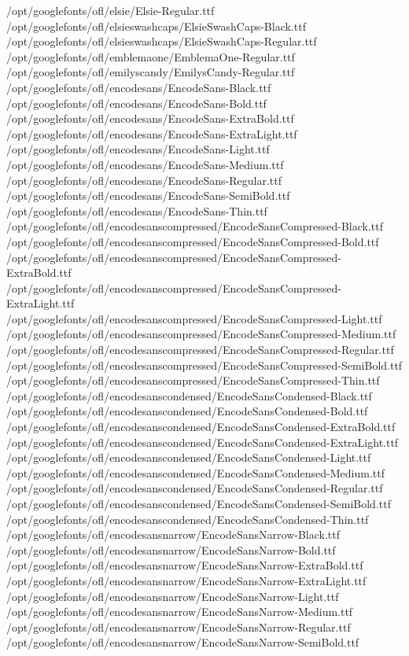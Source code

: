 /opt/googlefonts/ofl/elsie/Elsie-Regular.ttf
/opt/googlefonts/ofl/elsieswashcaps/ElsieSwashCaps-Black.ttf
/opt/googlefonts/ofl/elsieswashcaps/ElsieSwashCaps-Regular.ttf
/opt/googlefonts/ofl/emblemaone/EmblemaOne-Regular.ttf
/opt/googlefonts/ofl/emilyscandy/EmilysCandy-Regular.ttf
/opt/googlefonts/ofl/encodesans/EncodeSans-Black.ttf
/opt/googlefonts/ofl/encodesans/EncodeSans-Bold.ttf
/opt/googlefonts/ofl/encodesans/EncodeSans-ExtraBold.ttf
/opt/googlefonts/ofl/encodesans/EncodeSans-ExtraLight.ttf
/opt/googlefonts/ofl/encodesans/EncodeSans-Light.ttf
/opt/googlefonts/ofl/encodesans/EncodeSans-Medium.ttf
/opt/googlefonts/ofl/encodesans/EncodeSans-Regular.ttf
/opt/googlefonts/ofl/encodesans/EncodeSans-SemiBold.ttf
/opt/googlefonts/ofl/encodesans/EncodeSans-Thin.ttf
/opt/googlefonts/ofl/encodesanscompressed/EncodeSansCompressed-Black.ttf
/opt/googlefonts/ofl/encodesanscompressed/EncodeSansCompressed-Bold.ttf
/opt/googlefonts/ofl/encodesanscompressed/EncodeSansCompressed-ExtraBold.ttf
/opt/googlefonts/ofl/encodesanscompressed/EncodeSansCompressed-ExtraLight.ttf
/opt/googlefonts/ofl/encodesanscompressed/EncodeSansCompressed-Light.ttf
/opt/googlefonts/ofl/encodesanscompressed/EncodeSansCompressed-Medium.ttf
/opt/googlefonts/ofl/encodesanscompressed/EncodeSansCompressed-Regular.ttf
/opt/googlefonts/ofl/encodesanscompressed/EncodeSansCompressed-SemiBold.ttf
/opt/googlefonts/ofl/encodesanscompressed/EncodeSansCompressed-Thin.ttf
/opt/googlefonts/ofl/encodesanscondensed/EncodeSansCondensed-Black.ttf
/opt/googlefonts/ofl/encodesanscondensed/EncodeSansCondensed-Bold.ttf
/opt/googlefonts/ofl/encodesanscondensed/EncodeSansCondensed-ExtraBold.ttf
/opt/googlefonts/ofl/encodesanscondensed/EncodeSansCondensed-ExtraLight.ttf
/opt/googlefonts/ofl/encodesanscondensed/EncodeSansCondensed-Light.ttf
/opt/googlefonts/ofl/encodesanscondensed/EncodeSansCondensed-Medium.ttf
/opt/googlefonts/ofl/encodesanscondensed/EncodeSansCondensed-Regular.ttf
/opt/googlefonts/ofl/encodesanscondensed/EncodeSansCondensed-SemiBold.ttf
/opt/googlefonts/ofl/encodesanscondensed/EncodeSansCondensed-Thin.ttf
/opt/googlefonts/ofl/encodesansnarrow/EncodeSansNarrow-Black.ttf
/opt/googlefonts/ofl/encodesansnarrow/EncodeSansNarrow-Bold.ttf
/opt/googlefonts/ofl/encodesansnarrow/EncodeSansNarrow-ExtraBold.ttf
/opt/googlefonts/ofl/encodesansnarrow/EncodeSansNarrow-ExtraLight.ttf
/opt/googlefonts/ofl/encodesansnarrow/EncodeSansNarrow-Light.ttf
/opt/googlefonts/ofl/encodesansnarrow/EncodeSansNarrow-Medium.ttf
/opt/googlefonts/ofl/encodesansnarrow/EncodeSansNarrow-Regular.ttf
/opt/googlefonts/ofl/encodesansnarrow/EncodeSansNarrow-SemiBold.ttf
